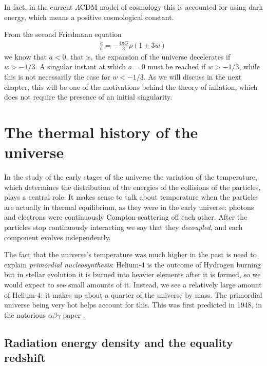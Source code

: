 \documentclass[main.tex]{subfiles}
\begin{document}
In fact, in the current \(\Lambda \)CDM model of cosmology this is accounted for using dark energy, which means a positive cosmological constant.

From the second Friedmann equation 
%
\begin{align}
\frac{\ddot{a}}{a} =- \frac{4 \pi G}{3} \rho (1+3w) 
\,
\end{align}
%
we know that \(\ddot{a} < 0\), that is, the expansion of the universe decelerates if \(w > - 1/3\).
A singular instant at which \(a =0\) must be reached if \(w>-1/3\), while this is not necessarily the case for \(w<-1/3\).
As we will discuss in the next chapter, this will be one of the motivations behind the theory of inflation, which does not require the presence of an initial singularity. 


\chapter{The thermal history of the universe}

In the study of the early stages of the universe the variation of the temperature, which determines the distribution of the energies of the collisions of the particles, plays a central role.
It makes sense to talk about temperature when the particles are actually in thermal equilibrium, as they were in the early universe: photons and electrons were continuously Compton-scattering off each other. 
After the particles stop continuously interacting we say that they \emph{decoupled}, and each component evolves independently. 

The fact that the universe's temperature was much higher in the past is need to explain \emph{primordial nucleosynthesis}: Helium-4 is the outcome of Hydrogen burning but in stellar evolution it is burned into heavier elements after it is formed, so we would expect to see small amounts of it. 
Instead, we see a relatively large amount of Helium-4: it makes up about a quarter of the universe by mass. 
The primordial universe being very hot helps account for this. 
This was first predicted in 1948, in the notorious \(\alpha \beta \gamma \) paper \cite[]{alpherOriginChemicalElements1948}. 

\section{Radiation energy density and the equality redshift}
\end{document}
